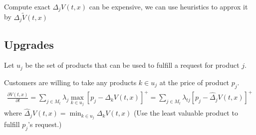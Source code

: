 \documentclass[11pt,a4paper]{article}
\begin{document}
\begin{center}
\end{center}

Compute exact $\Delta_j V(t,x)$ can be expensive, we can use heuristics to approx it by $\Delta_j \widetilde{V}(t,x)$

\subsection{Upgrades}
Let $u_j$ be the set of products that can be used to fulfill a request for product $j$.

Customers are willing to take any products $k\in u_j$ at the price of product $p_j$.
\begin{equation}
    \begin{aligned}
        \frac{\partial V(t, x)}{\partial t}=\sum_{j\in M_t} \lambda_{j}\max_{k\in u_j}\left[p_{j}-\Delta_kV(t,x)\right]^+=\sum_{j\in M_t} \lambda_{t j}\left[p_{j}-\hat{\Delta}_jV(t,x)\right]^+
    \end{aligned}
    \nonumber
\end{equation}
where $\hat{\Delta}_jV(t,x)=\min_{k\in u_j}\Delta_k V(t,x)$ (Use the least valuable product to fulfill $p_j$'s request.)
\end{document}
